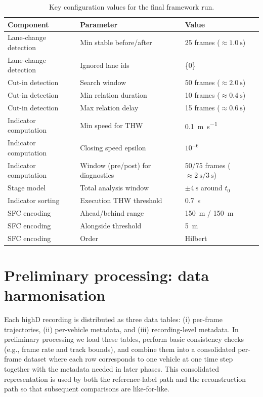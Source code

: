 \documentclass[12pt,a4paper,twoside,openright]{report}
\begin{document}
    \begin{table}[H]
        \centering
        \caption{Key configuration values for the final framework run.}
        \label{tab:config}
        {\small
        \setlength{\tabcolsep}{4pt}
            \begin{tabularx}{\textwidth}{@{}l l X@{}}
\toprule
Component & Parameter & Value \\
\midrule
Lane-change detection & Min stable before/after & 25 frames ($\approx \SI{1.0}{\second}$) \\
Lane-change detection & Ignored lane ids & \{0\} \\
Cut-in detection & Search window & 50 frames ($\approx \SI{2.0}{\second}$) \\
Cut-in detection & Min relation duration & 10 frames ($\approx \SI{0.4}{\second}$) \\
Cut-in detection & Max relation delay & 15 frames ($\approx \SI{0.6}{\second}$) \\
Indicator computation & Min speed for THW & \SI{0.1}{\meter\per\second} \\
Indicator computation & Closing speed epsilon & $10^{-6}$ \\
Indicator computation & Window (pre/post) for diagnostics & 50/75 frames ($\approx \SI{2}{\second}/\SI{3}{\second}$) \\
Stage model & Total analysis window & $\pm \SI{4}{\second}$ around $t_0$ \\
Indicator sorting & Execution THW threshold & \SI{0.7}{\second} \\
SFC encoding & Ahead/behind range & \SI{150}{\meter} / \SI{150}{\meter} \\
SFC encoding & Alongside threshold & \SI{5}{\meter} \\
SFC encoding & Order & Hilbert \\
\bottomrule
            \end{tabularx}}
    \end{table}

    \section{Preliminary processing: data harmonisation}
    Each highD recording is distributed as three data tables: (i) per-frame trajectories, (ii) per-vehicle metadata, and (iii) recording-level metadata. In preliminary processing we load these tables, perform basic consistency checks (e.g., frame rate and track bounds), and combine them into a consolidated per-frame dataset where each row corresponds to one vehicle at one time step together with the metadata needed in later phases. This consolidated representation is used by both the reference-label path and the reconstruction path so that subsequent comparisons are like-for-like.
\end{document}
